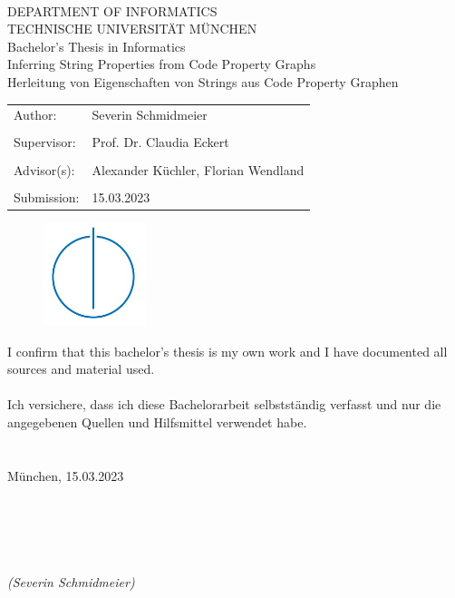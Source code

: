 \documentclass[footsepline,footinclude=false,oneside,fontsize=11pt,paper=a4,listof=totoc,bibliography=totoc]{scrbook} %
\newcommand{\thesistitle}{Inferring String Properties from Code Property Graphs}
\newcommand{\name}{Severin Schmidmeier}
\newcommand{\submission}{15.03.2023}
\begin{document}
\begin{center}
	\bigskip \bigskip \bigskip 
	\oTUM{5.0cm} \\
	\vspace*{0.8cm}
	{\huge DEPARTMENT OF INFORMATICS} \\
	\bigskip \bigskip 
	{\Large TECHNISCHE UNIVERSIT\"AT M\"UNCHEN} \\
	\bigskip \bigskip \bigskip \bigskip
	{\Large Bachelor's Thesis in Informatics} \\
	\bigskip \bigskip \bigskip \bigskip
	{\Large \thesistitle} \\   
	\bigskip \bigskip
	{\Large Herleitung von Eigenschaften von Strings aus Code Property Graphen} \\
\vfill

\begin{tabular}{ll}
{\large Author:} & {\large \name} \\\\
{\large Supervisor:} & {\large Prof. Dr. Claudia Eckert} \\\\
{\large Advisor(s):} & {\large Alexander K\"uchler, Florian Wendland} \\\\
{\large Submission:} & {\large \submission}
\end{tabular}\bigskip

\begin{figure}[htbp]
\centering \includegraphics[width=3cm]{logos/infologo.jpg}
\end{figure}
\bigskip
\end{center}

\newpage	
\thispagestyle{empty}
\hoffset=0mm
\vspace*{\fill}
\noindent I confirm that this bachelor's thesis is my own work and I have documented all sources and material used.\\\\
Ich versichere, dass ich diese Bachelorarbeit selbstst\"andig verfasst und nur die angegebenen Quellen und Hilfsmittel verwendet habe.\\\\\\
M\"unchen, \submission\\\\\\\\\\\\
\noindent \textit{(\name)}
\end{document}
